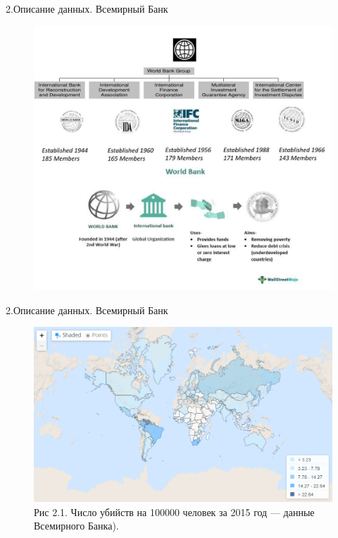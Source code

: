 \documentclass[aspectratio=169]{beamer}
\begin{document}
\begin{frame}{2.Описание данных. Всемирный Банк}
\begin{figure} \label{hompic}
            \centering
            \includegraphics[scale=0.4]{WBStr.png}
    \end{figure}
\end{frame}

\begin{frame}{2.Описание данных. Всемирный Банк}
\begin{figure} \label{hompic}
            \centering
            \includegraphics[scale=0.3]{homicides.png}
            \caption{Рис 2.1. Число убийств на 100000 человек за 2015 год --- данные Всемирного Банка).}
            
        \end{figure}
\end{frame}
\end{document}
